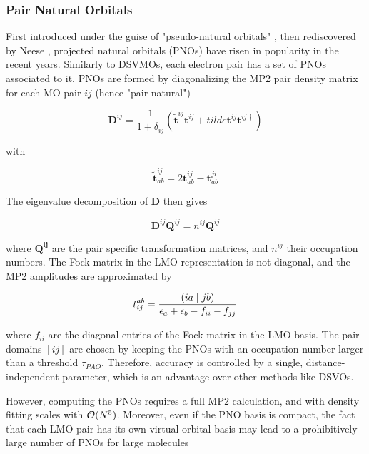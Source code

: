 \subsubsection*{Pair Natural Orbitals}
First introduced under the guise of "pseudo-natural orbitals" \cite{Edm1965}, then rediscovered by Neese \cite{Nee2009a,Nee2009b,Han2011}, projected natural orbitals (PNOs) have risen in popularity in the recent years. Similarly to DSVMOs, each electron pair has a set of PNOs associated to it. PNOs are formed by diagonalizing the MP2 pair density matrix for each MO pair $ij$ (hence "pair-natural")

\begin{equation}
\mathbf{D}^{ij} = \frac{1}{1+\delta_{ij}} \left(\tilde{\mathbf{t}}^{ij} \mathbf{t}^{ij} + tilde{\mathbf{t}}^{ij} \mathbf{t}^{ij\dagger} \right)
\end{equation}

\noindent with 

\begin{equation}
\mathbf{\tilde{t}}^{ij}_{ab} = 2 \mathbf{t}^{ij}_{ab} - \mathbf{t}^{ji}_{ab} 
\end{equation}

\noindent The eigenvalue decomposition of $\mathbf{D}$ then gives

\begin{equation}
\mathbf{D}^{ij} \mathbf{Q}^{ij} = n^{ij} \mathbf{Q}^{ij} 
\end{equation}

\noindent where $\mathbf{Q^{ij}}$ are the pair specific transformation matrices, and $n^{ij}$ their occupation numbers. The Fock matrix in the LMO representation is not diagonal, and the MP2 amplitudes are approximated by

\begin{equation}
t_{ij}^{ab} = \frac{\left( ia \mid jb \right)}{\epsilon_a + \epsilon_b - f_{ii} - f_{jj}}
\end{equation}

\noindent where $f_{ii}$ are the diagonal entries of the Fock matrix in the LMO basis. The pair domains $[ij]$ are chosen by keeping the PNOs with an occupation number larger than a threshold $\tau_{PAO}$. Therefore, accuracy is controlled by a single, distance-independent parameter, which is an advantage over other methods like DSVOs. 

However, computing the PNOs requires a full MP2 calculation, and with density fitting scales with $\mathcal{O}(N^{5})$. Moreover, even if the PNO basis is compact, the fact that each LMO pair has its own virtual orbital basis may lead to a prohibitively large number of PNOs for large molecules 

